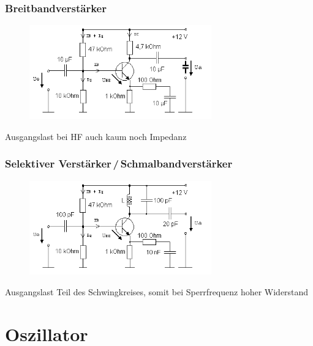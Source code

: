 \begin{frame}
  \frametitle{Breitbandverstärker}
  \begin{center}
    \begin{figure}
      \includegraphics[width=0.7\textwidth]{a07/Breitbandverstarker.png}
    \end{figure}
    Ausgangslast bei HF auch kaum noch Impedanz
  \end{center}
\end{frame}

\begin{frame}
  \frametitle{Selektiver Verstärker\,/\,Schmalbandverstärker}
  \begin{center}
    \begin{figure}
      \includegraphics[width=0.7\textwidth,height=.6\textheight,keepaspectratio]{a07/Selektiver_Verstarker.png}
    \end{figure}
    Ausgangslast Teil des Schwingkreises, somit bei Sperrfrequenz hoher Widerstand
  \end{center}
\end{frame}

\section*{Oszillator}

